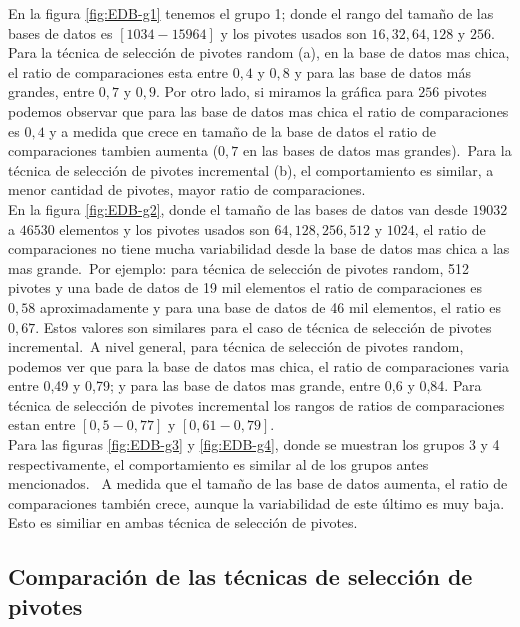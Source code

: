 En la figura \ref{fig:EDB-g1} tenemos el grupo 1; donde el rango del tama\~no de las bases de datos es $[1034-15964]$ y los pivotes usados son $16, 32, 64, 128$ y $256$. Para la t\'ecnica de selecci\'on de pivotes random (a), en la base de datos mas chica, el ratio de comparaciones esta entre $0,4$ y $0,8$ y para las base de datos m\'as grandes, entre $0,7$ y $0,9$. Por otro lado, si miramos la gr\'afica para $256$ pivotes podemos observar que para las base de datos mas chica el ratio de comparaciones es $0,4$ y a medida que crece en tama\~no de la base de datos el ratio de comparaciones tambien aumenta ($0,7$ en las bases de datos mas grandes).\
Para la t\'ecnica de selecci\'on de pivotes incremental (b), el comportamiento es similar, a menor cantidad de pivotes, mayor ratio de comparaciones.\\

En la figura \ref{fig:EDB-g2}, donde el tama\~no de las bases de datos van desde $19032$ a $46530$ elementos y los pivotes usados son $64, 128, 256, 512$ y $1024$, el ratio de comparaciones no tiene mucha variabilidad desde la base de datos mas chica a las mas grande.\
Por ejemplo: para t\'ecnica de selecci\'on de pivotes random, 512 pivotes y una bade de datos de 19 mil elementos el ratio de comparaciones es $0,58$ aproximadamente y para una base de datos de 46 mil elementos, el ratio es $0,67$. Estos valores son similares para el caso de t\'ecnica de selecci\'on de pivotes incremental.\
A nivel general, para t\'ecnica de selecci\'on de pivotes random, podemos ver que para la base de datos mas chica, el ratio de comparaciones varia entre 0,49 y 0,79; y para las base de datos mas grande, entre 0,6 y 0,84. Para t\'ecnica de selecci\'on de pivotes incremental los rangos de ratios de comparaciones estan entre $[0,5 - 0,77]$ y $[0,61 - 0,79]$. \\

Para las figuras \ref{fig:EDB-g3} y \ref{fig:EDB-g4}, donde se muestran los grupos 3 y 4 respectivamente, el comportamiento es similar al de los grupos antes mencionados.	\
A medida que el tama\~no de las base de datos aumenta, el ratio de comparaciones tambi\'en crece, aunque la variabilidad de este \'ultimo es muy baja. Esto es similiar en ambas  t\'ecnica de selecci\'on de pivotes.

\subsection{Comparaci\'on de las t\'ecnicas de selecci\'on de pivotes}


